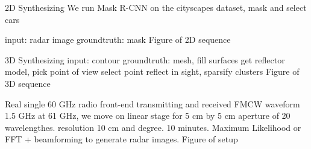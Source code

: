 2D Synthesizing 
	We run Mask R-CNN on the cityscapes dataset, mask and select cars 
	
	input: radar image
	groundtruth: mask
Figure of 2D sequence
	
3D Synthesizing 
	input: contour
	groundtruth:
	mesh, fill surfaces get reflector model, pick point of view select point reflect in sight, sparsify clusters
Figure of 3D sequence

Real 
single 60 GHz radio front-end transmitting and received FMCW waveform 1.5 GHz at 61 GHz, we move on linear stage for 5 cm by 5 cm aperture of 20 wavelengthes. resolution 10 cm and degree. 10 minutes. Maximum Likelihood or FFT + beamforming to generate radar images. Figure of setup  
		
	

